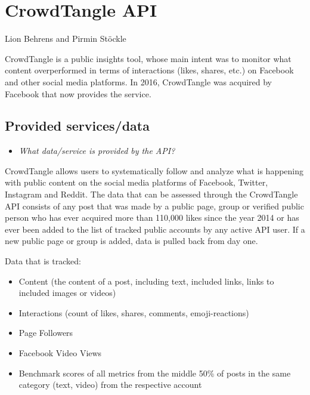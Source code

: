 \documentclass[
]{book}
\providecommand{\tightlist}{%
  \setlength{\itemsep}{0pt}\setlength{\parskip}{0pt}}
\begin{document}
\hypertarget{crowdtangle-api}{%
\chapter{CrowdTangle API}\label{crowdtangle-api}}

Lion Behrens and Pirmin Stöckle

CrowdTangle is a public insights tool, whose main intent was to monitor what content overperformed in terms of interactions (likes, shares, etc.) on Facebook and other social media platforms. In 2016, CrowdTangle was acquired by Facebook that now provides the service.

\hypertarget{provided-servicesdata-2}{%
\section{Provided services/data}\label{provided-servicesdata-2}}

\begin{itemize}
\tightlist
\item
  \emph{What data/service is provided by the API?}
\end{itemize}

CrowdTangle allows users to systematically follow and analyze what is happening with public content on the social media platforms of Facebook, Twitter, Instagram and Reddit.
The data that can be assessed through the CrowdTangle API consists of any post that was made by a public page, group or verified public person who has ever acquired more than 110,000 likes since the year 2014 or has ever been added to the list of tracked public accounts by any active API user. If a new public page or group is added, data is pulled back from day one.

Data that is tracked:

\begin{itemize}
\tightlist
\item
  Content (the content of a post, including text, included links, links to included images or videos)
\item
  Interactions (count of likes, shares, comments, emoji-reactions)
\item
  Page Followers
\item
  Facebook Video Views
\item
  Benchmark scores of all metrics from the middle 50\% of posts in the same category (text, video) from the respective account
\end{itemize}
\end{document}
